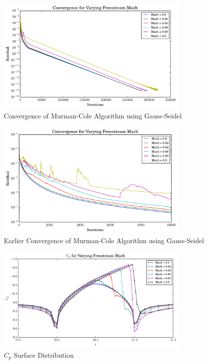 \documentclass[letterpaper,12pt,]{article}
\begin{document}
\begin{figure}[!htbp]
    \centering
    \includegraphics[width = 0.85\textwidth]{./Figures/convergenceq2.pdf}
    \caption {Convergence of Murman-Cole Algorithm using Gauss-Seidel}
    \label{fig:conv2}
\end{figure}

\begin{figure}[!htbp]
    \centering
    \includegraphics[width = 0.85\textwidth]{./Figures/convergenceq22.pdf}
    \caption{Earlier Convergence of Murman-Cole Algorithm using Gauss-Seidel}
    \label{fig:conv22}
\end{figure}

\begin{figure}[!htbp]
    \centering
    \includegraphics[width = 0.85\textwidth]{./Figures/cpsurf.pdf}
    \caption{$C_p$ Surface Distribution}
    \label{fig:cpsurf}
\end{figure}
\end{document}
